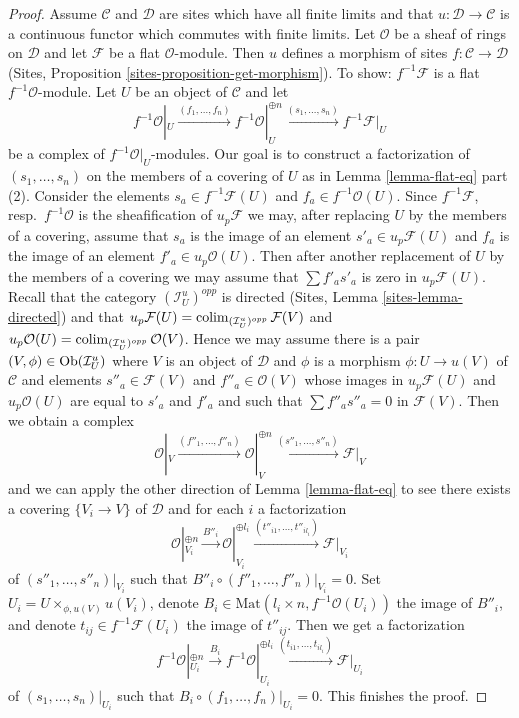 \begin{proof}
\medskip\noindent
Assume $\mathcal{C}$ and $\mathcal{D}$ are sites which
have all finite limits and that $u : \mathcal{D} \to \mathcal{C}$
is a continuous functor which commutes with finite limits.
Let $\mathcal{O}$ be a sheaf of rings on $\mathcal{D}$
and let $\mathcal{F}$ be a flat $\mathcal{O}$-module.
Then $u$ defines a morphism of sites $f : \mathcal{C} \to \mathcal{D}$
(Sites, Proposition \ref{sites-proposition-get-morphism}).
To show: $f^{-1}\mathcal{F}$ is a flat $f^{-1}\mathcal{O}$-module.
Let $U$ be an object of $\mathcal{C}$ and let
$$
f^{-1}\mathcal{O}|_U \xrightarrow{(f_1, \ldots, f_n)}
f^{-1}\mathcal{O}|_U^{\oplus n} \xrightarrow{(s_1, \ldots, s_n)}
f^{-1}\mathcal{F}|_U
$$
be a complex of $f^{-1}\mathcal{O}|_U$-modules.
Our goal is to construct a factorization of
$(s_1, \ldots, s_n)$ on the members of a covering of $U$
as in Lemma \ref{lemma-flat-eq} part (2).
Consider the elements $s_a \in f^{-1}\mathcal{F}(U)$
and $f_a \in f^{-1}\mathcal{O}(U)$.
Since $f^{-1}\mathcal{F}$, resp.\ $f^{-1}\mathcal{O}$
is the sheafification of $u_p\mathcal{F}$ we may,
after replacing $U$ by the members of a covering,
assume that $s_a$ is the image of an element $s'_a \in u_p\mathcal{F}(U)$ and
$f_a$ is the image of an element $f'_a \in u_p\mathcal{O}(U)$.
Then after another replacement of $U$ by the members of a covering
we may assume that $\sum f'_as'_a$ is zero in $u_p\mathcal{F}(U)$.
Recall that the category $(\mathcal{I}_U^u)^{opp}$ is directed
(Sites, Lemma \ref{sites-lemma-directed})
and that $u_p\mathcal{F}(U) = \mathop{\mathrm{colim}}\nolimits_{(\mathcal{I}_U^u)^{opp}} \mathcal{F}(V)$
and $u_p\mathcal{O}(U) = \mathop{\mathrm{colim}}\nolimits_{(\mathcal{I}_U^u)^{opp}} \mathcal{O}(V)$.
Hence we may assume there is a pair $(V, \phi) \in \mathop{\mathrm{Ob}}\nolimits(\mathcal{I}_U^u)$
where $V$ is an object of $\mathcal{D}$
and $\phi$ is a morphism $\phi : U \to u(V)$ of $\mathcal{C}$
and elements $s''_a \in \mathcal{F}(V)$ and $f''_a \in \mathcal{O}(V)$
whose images in $u_p\mathcal{F}(U)$ and $u_p\mathcal{O}(U)$
are equal to $s'_a$ and $f'_a$ and such that
$\sum f''_a s''_a = 0$ in $\mathcal{F}(V)$.
Then we obtain a complex
$$
\mathcal{O}|_V \xrightarrow{(f''_1, \ldots, f''_n)}
\mathcal{O}|_V^{\oplus n} \xrightarrow{(s''_1, \ldots, s''_n)}
\mathcal{F}|_V
$$
and we can apply the other direction of Lemma \ref{lemma-flat-eq}
to see there exists a covering $\{V_i \to V\}$ of $\mathcal{D}$
and for each $i$ a factorization
$$
\mathcal{O}|_{V_i}^{\oplus n}
\xrightarrow{B''_i}
\mathcal{O}|_{V_i}^{\oplus l_i} \xrightarrow{(t''_{i1}, \ldots, t''_{il_i})}
\mathcal{F}|_{V_i}
$$
of $(s''_1, \ldots, s''_n)|_{V_i}$ such that
$B''_i \circ (f''_1, \ldots, f''_n)|_{V_i} = 0$.
Set $U_i = U \times_{\phi, u(V)} u(V_i)$, denote
$B_i \in \text{Mat}(l_i \times n, f^{-1}\mathcal{O}(U_i))$
the image of $B''_i$, and denote
$t_{ij} \in f^{-1}\mathcal{F}(U_i)$ the image of
$t''_{ij}$. Then we get a factorization
$$
f^{-1}\mathcal{O}|_{U_i}^{\oplus n}
\xrightarrow{B_i}
f^{-1}\mathcal{O}|_{U_i}^{\oplus l_i}
\xrightarrow{(t_{i1}, \ldots, t_{il_i})}
\mathcal{F}|_{U_i}
$$
of $(s_1, \ldots, s_n)|_{U_i}$ such that
$B_i \circ (f_1, \ldots, f_n)|_{U_i} = 0$.
This finishes the proof.
\end{proof}


